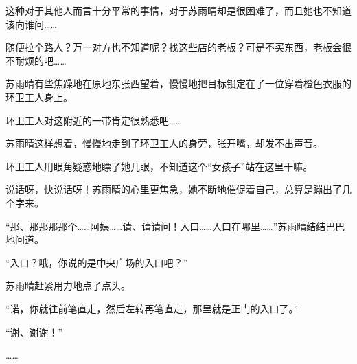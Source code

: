 这种对于其他人而言十分平常的事情，对于苏雨晴却是很困难了，而且她也不知道该向谁问……

随便拉个路人？万一对方也不知道呢？找这些店的老板？可是不买东西，老板会很不耐烦的吧……

苏雨晴有些焦躁地在原地东张西望着，慢慢地把目标锁定在了一位穿着橙色衣服的环卫工人身上。

环卫工人对这附近的一带肯定很熟悉吧……

苏雨晴这样想着，慢慢地走到了环卫工人的身旁，张开嘴，却发不出声音。

环卫工人用眼角疑惑地瞟了她几眼，不知道这个“女孩子”站在这里干嘛。

说话呀，快说话呀！苏雨晴的心里更焦急，她不断地催促着自己，总算是蹦出了几个字来。

“那、那那那那个……阿姨……请、请请问！入口……入口在哪里……”苏雨晴结结巴巴地问道。

“入口？哦，你说的是中央广场的入口吧？”

苏雨晴赶紧用力地点了点头。

“诺，你就往前笔直走，然后左转再笔直走，那里就是正门的入口了。”

“谢、谢谢！”

……
